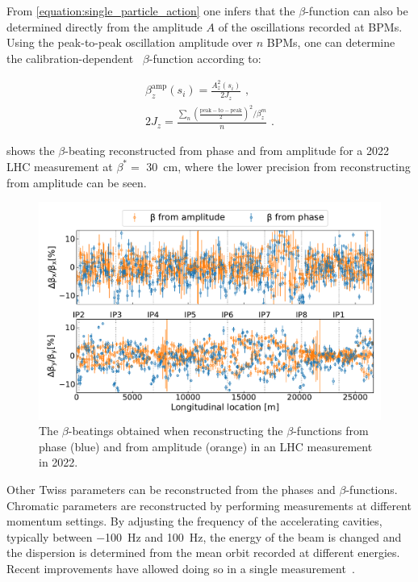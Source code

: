 From \cref{equation:single_particle_action} one infers that the \(\beta\)-function can also be determined directly from the amplitude \(A\) of the oscillations recorded at BPMs.
Using the peak-to-peak oscillation amplitude over \(n\) BPMs, one can determine the calibration-dependent~\cite{PRAB:GarciaTabares:BPM_Calibration} \(\beta\)-function according to:

\begin{equation}
  \begin{gathered}
    \beta_z^{\mathrm{amp}}(s_i) = \frac{A_z^2(s_i)}{2 J_z} \text{ ,} \\
    2 J_z                       = \frac{\sum_n \left(\frac{\mathrm{peak-to-peak}}{2}\right)^2 / \beta^m_z}{n} \text{ .}
  \end{gathered}
  \label{equation:beta_from_amplitude}
\end{equation}

 shows the \(\beta\)-beating reconstructed from phase and from amplitude for a \num{2022} LHC measurement at \(\beta^{\ast} =\) \qty{30}{\centi\meter}, where the lower precision from reconstructing from amplitude can be seen.

\begin{figure}[!htb]
  \centering
  \includegraphics*[width=0.99\linewidth]{Figures/Optics_Measurements_Corrections_at_LHC/betabeat_phase_vs_amp.pdf}
  \caption{The \(\beta\)-beatings obtained when reconstructing the \(\beta\)-functions from phase (\textcolor{mplblue}{blue}) and from amplitude (\textcolor{mplorange}{orange}) in an LHC measurement in \num{2022}.}
  \label{figure:betabeating_phase_vs_amp}
\end{figure}

Other Twiss parameters can be reconstructed from the phases and \(\beta\)-functions.
Chromatic parameters are reconstructed by performing measurements at different momentum settings.
By adjusting the frequency of the accelerating cavities, typically between \qty{-100}{\hertz} and \qty{+100}{\hertz}, the energy of the beam is changed and the dispersion is determined from the mean orbit recorded at different energies.
Recent improvements have allowed doing so in a single measurement~\cite{PHD:Malina, IPAC:Malina:3D_Excitation}.

